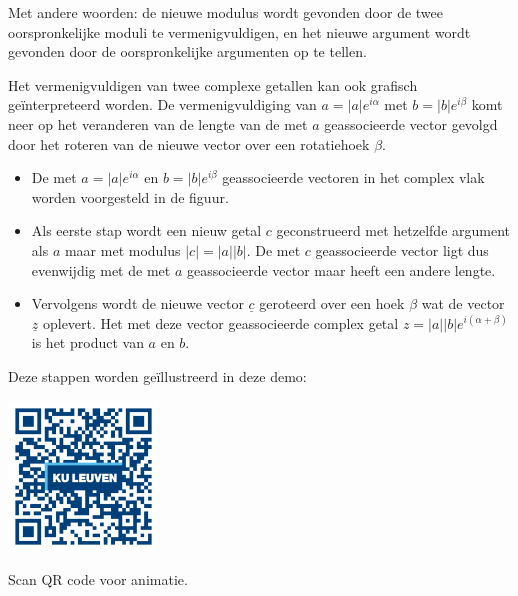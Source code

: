 Met andere woorden: de nieuwe modulus wordt gevonden door de twee oorspronkelijke moduli te vermenigvuldigen, en het nieuwe argument wordt gevonden door de oorspronkelijke argumenten op te tellen.\\

\vspace{0.2cm}

Het vermenigvuldigen van twee complexe getallen kan ook grafisch ge\"{i}nterpreteerd worden. De vermenigvuldiging van $a=|a|e^{i\alpha}$ met $b=|b|e^{i\beta}$ komt neer op het veranderen van de lengte van de met $a$ geassocieerde vector gevolgd door het roteren van de nieuwe vector over een rotatiehoek $\beta$.\\



\begin{figure}[H]
	\centering 
	 
\end{figure}



\begin{itemize}
	\item De met $a=|a|e^{i\alpha}$ en $b=|b|e^{i\beta}$ geassocieerde vectoren in het complex vlak worden voorgesteld in de figuur.
	\item Als eerste stap wordt een nieuw getal $c$ geconstrueerd met hetzelfde argument als $a$ maar met modulus $|c|=|a||b|$. De met $c$ geassocieerde vector ligt dus evenwijdig met de met $a$ geassocieerde vector maar heeft een andere lengte.
	\item Vervolgens wordt de nieuwe vector $\underline{c}$ geroteerd over een hoek $\beta$ wat de vector $\underline{z}$ oplevert. Het met deze vector geassocieerde complex getal $z=|a||b|e^{i(\alpha + \beta)}$ is het product van $a$ en $b$.
\end{itemize}

Deze stappen worden ge\"{i}llustreerd in deze demo:\\

\begin{minipage}{.25\linewidth}
	\raggedright
	\includegraphics[width=4cm]{3_gonio_complexe_getallen/inputs/QR_Code_ANIMATIE4_module3new}
\end{minipage}
\begin{minipage}{.7\linewidth}
	Scan QR code voor animatie.
\end{minipage}    \\

